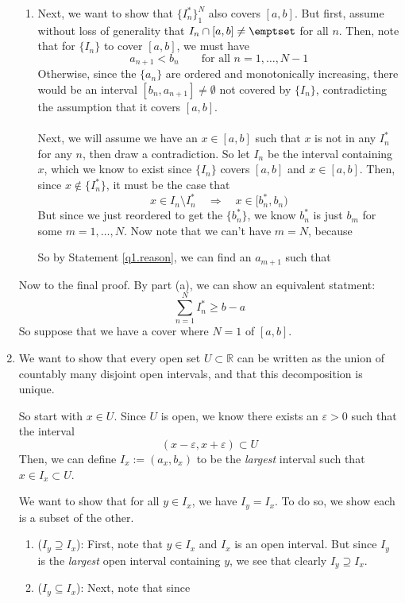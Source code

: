\documentclass[12pt]{article}
\theoremstyle{plain}
\theoremstyle{definition}
\theoremstyle{remark}
\begin{document}
\begin{enumerate}
\begin{enumerate}
\item Next, we want to show that $\{I_n^*\}^N_1$ also covers $[a,b]$. But first, assume without loss of generality that $I_n\cap [a,b] \neq \emptset$ for all $n$. Then, note that for $\{I_n\}$ to cover $[a,b]$, we must have 
\begin{equation}
    \label{q1.reason}
    a_{n+1} < b_n 
    \qquad \text{for all $n=1,\ldots,N-1$}
\end{equation}
Otherwise, since the $\{a_n\}$ are ordered and monotonically increasing, there would be an interval $[b_n, a_{n+1}]\neq\emptyset$ not covered by $\{I_n\}$, contradicting the assumption that it covers $[a,b]$.
\\
\\
Next, we will assume we have an $x\in[a,b]$ such that $x$ is not in any $I_n^*$ for any $n$, then draw a contradiction. So let $I_n$ be the interval containing $x$, which we know to exist since $\{I_n\}$ covers $[a,b]$ and $x\in[a,b]$. Then, since $x\not\in \{I_n^*\}$, it must be the case that
\[
    x \in I_n \setminus I_n^* \quad \Rightarrow \quad
    x \in [b_n^*, b_n)
\]
But since we just reordered to get the $\{b_n^*\}$, we know $b_n^*$ is just $b_m$ for some $m=1,\ldots,N$. Now note that we can't have $m=N$, because 

So by Statement \ref{q1.reason}, we can find an $a_{m+1}$ such that 

\end{enumerate}

Now to the final proof. By part (a), we can show an equivalent statment:
\begin{equation}
    \label{q1.toshow}
    \sum_{n=1}^N I^*_n \geq b - a
\end{equation}
So suppose that we have a cover where $N=1$ of $[a,b]$. 


\item We want to show that every open set $U\subset\mathbb{R}$ can be written as the union of countably many disjoint open intervals, and that this decomposition is unique.

So start with $x\in U$. Since $U$ is open, we know there exists an $\varepsilon>0$ such that the interval
\begin{equation}
    (x-\varepsilon, x+\varepsilon) \subset U
\end{equation}
Then, we can define $I_x:=(a_x, b_x)$ to be the \emph{largest} interval such that $x\in I_x \subset U$.

We want to show that for all $y\in I_x$, we have $I_y = I_x$. To do so, we show each is a subset of the other.
\begin{enumerate}
    \item ($I_y\supseteq I_x$): First, note that $y\in I_x$ and $I_x$ is an open interval. But since $I_y$ is the \emph{largest} open interval containing $y$, we see that clearly $I_y\supseteq I_x$. 
    \item ($I_y\subseteq I_x$): Next, note that since 
    
\end{enumerate}





\end{enumerate}
\end{document}
